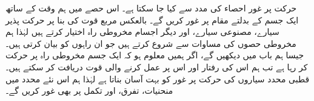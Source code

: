 

حرکت پر غور احصاء کی مدد سے کیا جا سکتا ہے۔ اس حصے میں ہم وقت کے ساتھ ایک جسم کے بدلتے مقام پر غور کریں گے۔      بالعکس مربع قوت کی  بنا پر  حرکت پذیر  سیارے، مصنوعی سیارے، اور دیگر اجسام   مخروطی راہ  اختیار  کرتے ہیں لہٰذا  ہم  مخروطی حصوں کی مساوات سے شروع کرتے ہیں جو ان راہوں  کو بیان کرتی ہیں۔ جیسا ہم باب  میں دیکھیں گے، اگر ہمیں معلوم ہو کہ ایک جسم مخروطی راہ پر حرکت کر رہا ہے  تب ہم اس کی رفتار اور اس پر عمل کرنے والی قوت دریافت کر سکتے ہیں۔  قطبی محدد سیاروں کی حرکت پر غور کو بہت آسان بناتا ہے لہٰذا ہم اس نئے محدد میں منحنیات، تفرق،  اور تکمل پر بھی غور کریں گے۔




